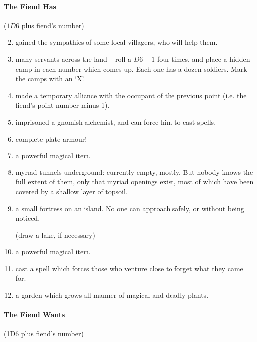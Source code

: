 \begin{multicols}{2}
\begin{dlist}
\end{dlist}

\paragraph{The Fiend Has}

($1D6$ plus fiend's number)

\begin{enumerate}
\setcounter{enumi}{1}
\item
  gained the sympathies of some local villagers, who will help them.
\item
  many servants across the land -- roll a $D6 + 1$ four times, and place a hidden camp in each number which comes up.
  Each one has a dozen soldiers.
  Mark the camps with an `X'.
\item
  made a temporary alliance with the occupant of the previous point (i.e. the fiend's point-number minus 1).
\item
  imprisoned a gnomish alchemist, and can force him to cast spells.
\item
  complete plate armour!
\item
  a powerful magical item.
\item
  myriad tunnels underground: currently empty, mostly. But nobody knows
  the full extent of them, only that myriad openings exist, most of
  which have been covered by a shallow layer of topsoil.
\item
  a small fortress on an island. No one can approach safely, or without
  being noticed.

  (draw a lake, if necessary)
\item
  a powerful magical item.
\item
  cast a spell which forces those who venture close to forget what they
  came for.
\item
  a garden which grows all manner of magical and deadly plants.
\end{enumerate}

\paragraph{The Fiend Wants}
\label{fiendDesires}

(1D6 plus fiend's number)


\end{multicols}

